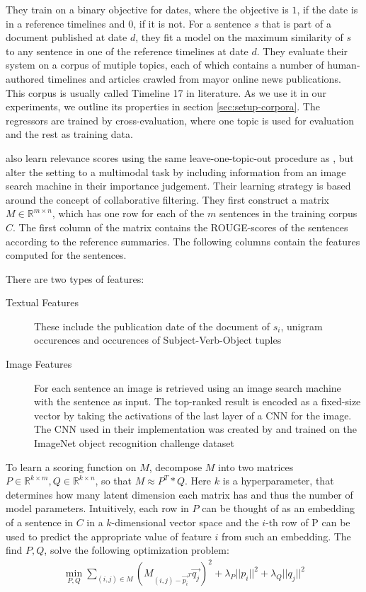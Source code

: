 \documentclass[a4paper,BCOR=10mm]{report}
\numberwithin{lemma}{chapter}
\numberwithin{definition}{chapter}
\begin{document}
They train on a binary objective for dates, where the objective is $1$, if the date is in a reference timelines and $0$, if it is not.
For a sentence $s$ that is part of a document published at date $d$, they fit a model on the maximum similarity of $s$ to any sentence in one of the reference timelines at date $d$.
They evaluate their system on a corpus of mutiple topics, each of which contains a number of human-authored timelines and articles crawled from mayor online news publications. This corpus is usually called Timeline 17 in literature. As we use it in our experiments, we outline its properties in section \ref{sec:setup-corpora}. The regressors are trained by cross-evaluation, where one topic is used for evaluation and the rest as training data.

\citet{multimodal} also learn relevance scores using the same leave-one-topic-out procedure as \citet{tran-headlines}, but alter the setting to a multimodal task by including information from an image search machine in their importance judgement.
Their learning strategy is based around the concept of collaborative filtering.
They first construct a matrix $M \in \mathbb{R}^{m \times n}$, which has one row for each of the $m$ sentences in the training corpus $C$. The first column of the matrix contains the ROUGE-scores of the sentences according to the reference summaries. The following columns contain the features computed for the sentences.

There are two types of features:

\begin{description}
\item[Textual Features]{These include the publication date of the document of $s_i$, unigram occurences and occurences of Subject-Verb-Object tuples}
\item[Image Features]{For each sentence an image is retrieved using an image search machine with the sentence as input. The top-ranked result is encoded as a fixed-size vector by taking the activations of the last layer of a CNN for the image. The CNN used in their implementation was created by \citet{Simonyan+Zisserman} and trained on the ImageNet \citep{ImageNet} object recognition challenge dataset}
\end{description}

To learn a scoring function on $M$, \citet{multimodal} decompose $M$ into two matrices $P \in \mathbb{R}^{k \times m}, Q \in \mathbb{R}^{k \times n}$, so that $M \approx P^T * Q$. Here $k$ is a hyperparameter, that determines how many latent dimension each matrix has and thus the number of model parameters. Intuitively, each row in $P$ can be thought of as an embedding of a sentence in $C$ in a $k$-dimensional vector space and the $i$-th row of P can be used to predict the appropriate value of feature $i$ from such an embedding.
The find $P, Q$, \citeauthor{multimodal} solve the following optimization problem:
\begin{align}
\min_{P, Q} \sum_{(i,j) \in M} (M_{(i,j) - \vec{p_i}^T}\vec{q_j})^2 + \lambda_P ||p_i|| ^ 2 + \lambda_Q ||q_j|| ^ 2 \label{multimodal-objective}
\end{align}
\end{document}
